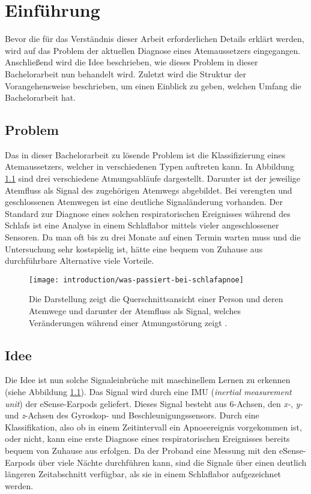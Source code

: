 
\chapter{Einführung}
\label{ch:Introduction}
Bevor die für das Verständnis dieser Arbeit erforderlichen Details erklärt werden, wird auf das Problem der aktuellen Diagnose eines Atemaussetzers eingegangen. 
Anschließend wird die Idee beschrieben, wie dieses Problem in dieser Bachelorarbeit nun behandelt wird.
Zuletzt wird die Struktur der Vorangehensweise beschrieben, um einen Einblick zu geben, welchen Umfang die Bachelorarbeit hat.

\section{Problem}
Das in dieser Bachelorarbeit zu lösende Problem ist die Klassifizierung eines Atemaussetzers, welcher in verschiedenen Typen auftreten kann. 
In Abbildung \ref{introduction:problem_description} sind drei verschiedene Atmungsabläufe dargestellt. 
Darunter ist der jeweilige Atemfluss als Signal des zugehörigen Atemwegs abgebildet.
Bei verengten und geschlossenen Atemwegen ist eine deutliche Signaländerung vorhanden. 
Der Standard zur Diagnose eines solchen respiratorischen Ereignisses während des Schlafs ist eine Analyse in einem Schlaflabor mittels vieler angeschlossener Sensoren. 
Da man oft bis zu drei Monate auf einen Termin warten muss und die Untersuchung sehr kostspielig ist, hätte eine bequem von Zuhause aus durchführbare Alternative viele Vorteile.


\begin{figure}[h]
  \centering
  \texttt{[image: introduction/was-passiert-bei-schlafapnoe]}  
  \caption{Die Darstellung zeigt die Querschnittsansicht einer Person und deren Atemwege und darunter der Atemfluss als Signal, welches Veränderungen während einer Atmungsstörung zeigt \cite{DeutscheFamilienversicherungSchlafapnoesyndrom}.}
  \label{introduction:problem_description}
\end{figure}

\newpage

\section{Idee}
Die Idee ist nun solche Signaleinbrüche mit maschinellem Lernen zu erkennen (siehe Abbildung \ref{introduction:problem_description}). 
Das Signal wird durch eine IMU (\textit{inertial measurement unit}) der eSense-Earpods geliefert.
Dieses Signal besteht aus 6-Achsen, den \textit{x-}, \textit{y-} und \textit{z}-Achsen des Gyroskop- und Beschleunigungssensors.
Durch eine Klassifikation, also ob in einem Zeitintervall ein Apnoeereignis vorgekommen ist, oder nicht, kann eine erste Diagnose eines respiratorischen Ereignisses bereits bequem von Zuhause aus erfolgen.
Da der Proband eine Messung mit den eSense-Earpods über viele Nächte durchführen kann, sind die Signale über einen deutlich längeren Zeitabschnitt verfügbar, als sie in einem Schlaflabor aufgezeichnet werden.

